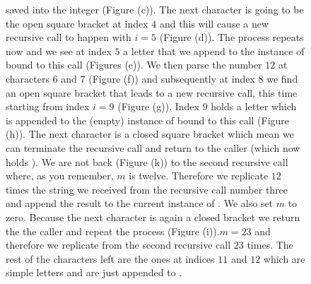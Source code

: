 \begin{figure}
{	saved into the integer  (Figure (c)). The next character is going to be the open
	square bracket at index $4$  and this will cause a new recursive call to happen with $i=5$
	(Figure (d)). The process repeats now and we see at index $5$ a letter that we append to the
	instance of  bound to this call (Figures (e)). We then parse the number $12$ at
	characters $6$ and $7$ (Figure (f)) and subsequently at index $8$ we find an open square bracket
	that leads to a new recursive call, this time starting from index $i=9$ (Figure (g)). Index $9$ holds
	a letter which is appended to the (empty) instance of  bound to this call (Figure
	(h)). The next character is a closed square bracket which mean we can terminate the recursive
	call and return to the caller  (which now holds ). We are not back
	(Figure (k)) to the second recursive call where, as you remember, $m$ is twelve. Therefore we
	replicate $12$ times the string we received from the recursive call number three and append the
	result to the current instance of . We also set $m$ to zero. Because the next
	character is again a closed bracket we return the the caller and repeat the process (Figure
	(i)).$m=23$ and therefore we replicate  from the second recursive call $23$ times.
	The rest of the characters left are the ones at indices $11$ and $12$ which are simple letters
	and are just appended to .}	
   \label{fig:decode_string:recursion}
 \end{figure}

